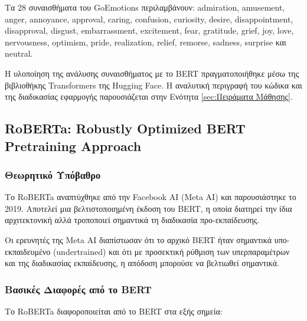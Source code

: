 \documentclass[a4paper,11pt,oneside,openany]{ioniothesis}
\begin{document}
Τα 28 συναισθήματα του GoEmotions περιλαμβάνουν: admiration, amusement, anger, annoyance, approval, caring, confusion, curiosity, desire, disappointment, disapproval, disgust, embarrassment, excitement, fear, gratitude, grief, joy, love, nervousness, optimism, pride, realization, relief, remorse, sadness, surprise και neutral.

Η υλοποίηση της ανάλυσης συναισθήματος με το BERT πραγματοποιήθηκε μέσω της βιβλιοθήκης Transformers της Hugging Face. Η αναλυτική περιγραφή του κώδικα και της διαδικασίας εφαρμογής παρουσιάζεται στην Ενότητα \ref{sec:Πειράματα Μάθησης}.

\subsection{RoBERTa: Robustly Optimized BERT Pretraining Approach}
\label{sec:RoBERTa GoEmotions}

\subsubsection{Θεωρητικό Υπόβαθρο}
\label{sec:Θεωρητικό Υπόβαθρο RoBERTa}

Το RoBERTa αναπτύχθηκε από την Facebook AI (Meta AI) και παρουσιάστηκε το 2019. Αποτελεί μια βελτιστοποιημένη έκδοση του BERT, η οποία διατηρεί την ίδια αρχιτεκτονική αλλά τροποποιεί σημαντικά τη διαδικασία προ-εκπαίδευσης.

Οι ερευνητές της Meta AI διαπίστωσαν ότι το αρχικό BERT ήταν σημαντικά υπο-εκπαιδευμένο (undertrained) και ότι με προσεκτική ρύθμιση των υπερπαραμέτρων και της διαδικασίας εκπαίδευσης, η απόδοση μπορούσε να βελτιωθεί σημαντικά.


\subsubsection{Βασικές Διαφορές από το BERT}
\label{sec:Βασικές Διαφορές από το BERT}

Το RoBERTa διαφοροποιείται από το BERT στα εξής σημεία:
\end{document}
